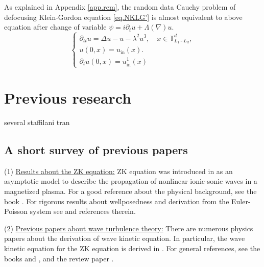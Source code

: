 As explained in Appendix \ref{app.rem}, the random data Cauchy problem of defocusing Klein-Gordon equation \eqref{eq.NKLG'} is almost equivalent to above equation after change of variable $\psi=i\partial_tu+\Lambda(\nabla)u$.
\begin{equation}\label{eq.NKLG'}
\begin{cases}
\partial_{tt} u = \Delta u -u - \lambda^2 u^3,  \quad x\in \mathbb{T}^d_{L_1\cdots L_d},   \\[.6em]
u(0,x) = u_{\textrm{in}}(x).
\\[.6em]
\partial_tu(0,x) = u^{1}_{\textrm{in}}(x)
\end{cases}    
\end{equation}



\section{Previous research}

several staffilani tran 

\subsection{A short survey of previous papers} (1) \underline{Results about the ZK equation:} ZK equation was introduced in \cite{zakharov1974three} as an asymptotic model to describe the propagation of nonlinear ionic-sonic waves in a magnetized plasma. For a good reference about the physical background, see the book \cite{davidson2012methods}. For rigorous results about wellposedness and derivation from the Euler-Poisson system see \cite{lannes2013cauchy} and references therein.

(2) \underline{Previous papers about wave turbulence theory:} There are numerous physics papers about the derivation of wave kinetic equation. In particular, the wave kinetic equation for the ZK equation is derived in \cite{kuznetsov1972turbulence}. For general references, see the books \cite{zakharov2012kolmogorov} and \cite{nazarenko2011wave}, and the review paper \cite{newell2011wave}. 


